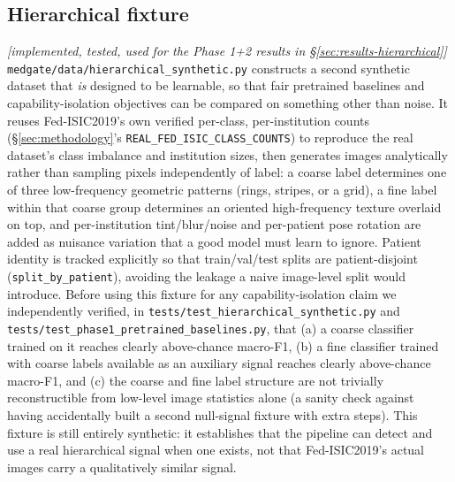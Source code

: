 \documentclass[11pt]{article}
\newcommand{\status}[1]{\textit{[#1]}}
\begin{document}
\subsection{Hierarchical fixture} \status{implemented, tested, used for the
Phase 1+2 results in \S\ref{sec:results-hierarchical}}
\label{sec:hierarchical-fixture}
\texttt{medgate/data/hierarchical\_synthetic.py} constructs a second
synthetic dataset that \emph{is} designed to be learnable, so that fair
pretrained baselines and capability-isolation objectives can be compared on
something other than noise. It reuses Fed-ISIC2019's own verified per-class,
per-institution counts (\S\ref{sec:methodology}'s
\texttt{REAL\_FED\_ISIC\_CLASS\_COUNTS}) to reproduce the real dataset's
class imbalance and institution sizes, then generates images analytically
rather than sampling pixels independently of label: a coarse label
determines one of three low-frequency geometric patterns (rings, stripes, or
a grid), a fine label within that coarse group determines an oriented
high-frequency texture overlaid on top, and per-institution tint/blur/noise
and per-patient pose rotation are added as nuisance variation that a good
model must learn to ignore. Patient identity is tracked explicitly so that
train/val/test splits are patient-disjoint (\texttt{split\_by\_patient}),
avoiding the leakage a naive image-level split would introduce. Before using
this fixture for any capability-isolation claim we independently verified,
in \texttt{tests/test\_hierarchical\_synthetic.py} and
\texttt{tests/test\_phase1\_pretrained\_baselines.py}, that (a) a coarse
classifier trained on it reaches clearly above-chance macro-F1, (b) a fine
classifier trained with coarse labels available as an auxiliary signal
reaches clearly above-chance macro-F1, and (c) the coarse and fine label
structure are not trivially reconstructible from low-level image statistics
alone (a sanity check against having accidentally built a second null-signal
fixture with extra steps). This fixture is still entirely synthetic: it
establishes that the pipeline can detect and use a real hierarchical signal
when one exists, not that Fed-ISIC2019's actual images carry a
qualitatively similar signal.
\end{document}
